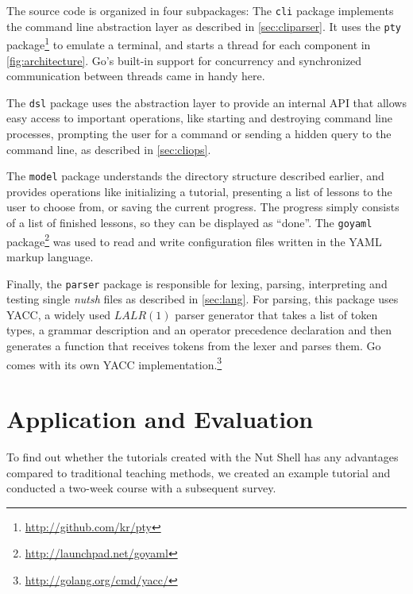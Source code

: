 \documentclass[paper=a4,twoside,abstract=on,cleardoublepage=empty,numbers=noenddot,toc=bib,12pt,appendixprefix=true]{scrreprt}
\begin{document}
The source code is organized in four subpackages: The \texttt{cli} package implements the command line abstraction layer as described in \cref{sec:cliparser}. It uses the \texttt{pty} package\footnote{\url{http://github.com/kr/pty}} to emulate a terminal, and starts a thread for each component in \cref{fig:architecture}. Go's built-in support for concurrency and synchronized communication between threads came in handy here.

The \texttt{dsl} package uses the abstraction layer to provide an internal API that allows easy access to important operations, like starting and destroying command line processes, prompting the user for a command or sending a hidden query to the command line, as described in \cref{sec:cliops}.

The \texttt{model} package understands the directory structure described earlier, and provides operations like initializing a tutorial, presenting a list of lessons to the user to choose from, or saving the current progress. The progress simply consists of a list of finished lessons, so they can be displayed as “done”. The \texttt{goyaml} package\footnote{\url{http://launchpad.net/goyaml}} was used to read and write configuration files written in the \textsc{YAML} markup language.

Finally, the \texttt{parser} package is responsible for lexing, parsing, interpreting and testing single \emph{nutsh} files as described in \cref{sec:lang}. For parsing, this package uses \textsc{YACC}, a widely used $LALR(1)$ parser generator that takes a list of token types, a grammar description and an operator precedence declaration and then generates a function that receives tokens from the lexer and parses them. Go comes with its own YACC implementation.\footnote{\url{http://golang.org/cmd/yacc/}}


%
%

\chapter{Application and Evaluation}
\label{sec:evaluation}

To find out whether the tutorials created with the Nut Shell has any advantages compared to traditional teaching methods, we created an example tutorial and conducted a two-week course with a subsequent survey.
\end{document}
